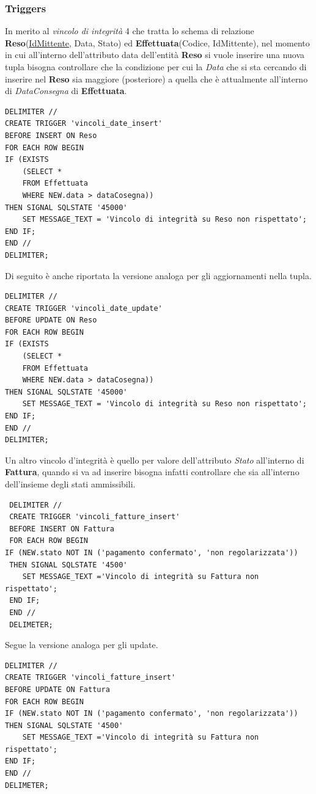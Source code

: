 \subsubsection{Triggers}
In merito al \textit{vincolo di integrità} 4 che tratta lo schema di relazione \textbf{Reso}(\underline{IdMittente}, Data, Stato) ed \textbf{Effettuata}(Codice, IdMittente), nel momento in cui all'interno dell'attributo data dell'entità \textbf{Reso} si vuole inserire una nuova tupla bisogna controllare che la condizione per cui la \textit{Data} che si sta cercando di inserire nel \textbf{Reso} sia maggiore (posteriore) a quella che è attualmente all'interno di \textit{DataConsegna }di \textbf{Effettuata}.
\begin{verbatim}
DELIMITER //
CREATE TRIGGER 'vincoli_date_insert'
BEFORE INSERT ON Reso
FOR EACH ROW BEGIN
IF (EXISTS 
	(SELECT *
	FROM Effettuata
	WHERE NEW.data > dataCosegna))
THEN SIGNAL SQLSTATE '45000'
	SET MESSAGE_TEXT = 'Vincolo di integrità su Reso non rispettato';
END IF;
END //
DELIMITER;
\end{verbatim}
Di seguito è anche riportata la versione analoga per gli aggiornamenti nella tupla.
\begin{verbatim}
DELIMITER //
CREATE TRIGGER 'vincoli_date_update' 
BEFORE UPDATE ON Reso
FOR EACH ROW BEGIN
IF (EXISTS 
	(SELECT *
	FROM Effettuata
	WHERE NEW.data > dataCosegna))
THEN SIGNAL SQLSTATE '45000'
	SET MESSAGE_TEXT = 'Vincolo di integrità su Reso non rispettato';
END IF;
END //
DELIMITER;
\end{verbatim}
 Un altro vincolo d'integrità è quello per valore dell'attributo \textit{Stato} all'interno di \textbf{Fattura}, quando si va ad inserire bisogna infatti controllare che sia all'interno dell'insieme degli stati ammissibili.
 \begin{verbatim}
 DELIMITER //
 CREATE TRIGGER 'vincoli_fatture_insert'
 BEFORE INSERT ON Fattura
 FOR EACH ROW BEGIN 
IF (NEW.stato NOT IN ('pagamento confermato', 'non regolarizzata'))
 THEN SIGNAL SQLSTATE '4500'
 	SET MESSAGE_TEXT ='Vincolo di integrità su Fattura non rispettato';
 END IF;
 END //
 DELIMETER;
 \end{verbatim}
Segue la versione analoga per gli update.
\begin{verbatim}
DELIMITER //
CREATE TRIGGER 'vincoli_fatture_insert'
BEFORE UPDATE ON Fattura
FOR EACH ROW BEGIN 
IF (NEW.stato NOT IN ('pagamento confermato', 'non regolarizzata'))
THEN SIGNAL SQLSTATE '4500'
	SET MESSAGE_TEXT ='Vincolo di integrità su Fattura non rispettato';
END IF;
END //
DELIMETER;
\end{verbatim}

